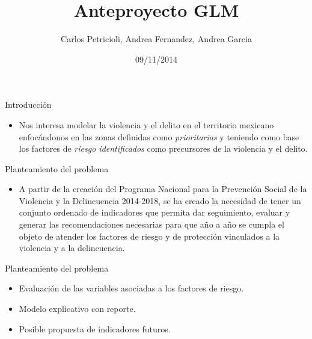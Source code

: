 \documentclass[ignorenonframetext,]{beamer}
\title{Anteproyecto GLM}
\author{Carlos Petricioli, Andrea Fernandez, Andrea Garcia}
\date{09/11/2014}
\begin{document}
\frame{\titlepage}

\begin{frame}{Introducción}

\begin{itemize}
\itemsep1pt\parskip0pt
\item
  Nos interesa modelar la violencia y el delito en el territorio
  mexicano enfocándonos en las zonas definidas como \emph{prioritarias}
  y teniendo como base los factores de \emph{riesgo identificados} como
  precursores de la violencia y el delito.
\end{itemize}

\end{frame}

\begin{frame}{Planteamiento del problema}

\begin{itemize}
\itemsep1pt\parskip0pt
\item
  A partir de la creación del Programa Nacional para la Prevención
  Social de la Violencia y la Delincuencia 2014-2018, se ha creado la
  necesidad de tener un conjunto ordenado de indicadores que permita dar
  seguimiento, evaluar y generar las recomendaciones necesarias para que
  año a año se cumpla el objeto de atender los factores de riesgo y de
  protección vinculados a la violencia y a la delincuencia.
\end{itemize}

\end{frame}

\begin{frame}{Planteamiento del problema}

\begin{itemize}
\item
  Evaluación de las variables asociadas a los factores de riesgo.
\item
  Modelo explicativo con reporte.
\item
  Posible propuesta de indicadores futuros.
\end{itemize}

\end{frame}
\end{document}
